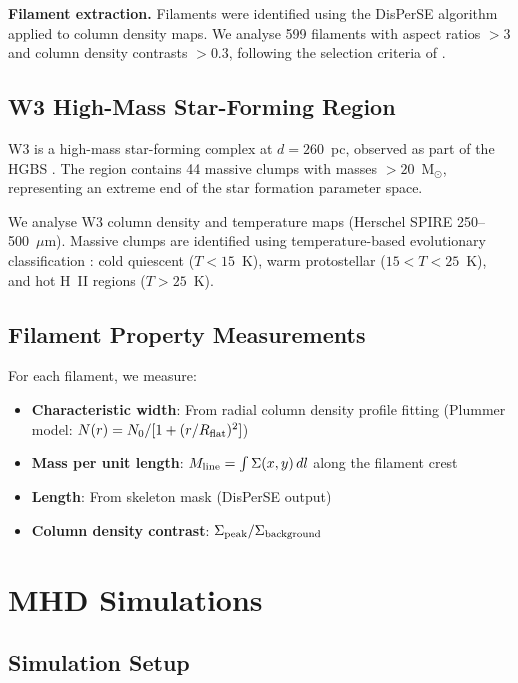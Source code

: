 \documentclass{mnras}
\begin{document}
\textbf{Filament extraction.} Filaments were identified using the DisPerSE algorithm \citep{Sousbie2011} applied to column density maps. We analyse 599 filaments with aspect ratios $>3$ and column density contrasts $>0.3$, following the selection criteria of \citet{Arzoumanian2019}.

\subsection{W3 High-Mass Star-Forming Region}

W3 is a high-mass star-forming complex at $d = 260$~pc, observed as part of the HGBS \citep{Schneider2012}. The region contains 44 massive clumps with masses $>20$~M$_\odot$, representing an extreme end of the star formation parameter space.

We analyse W3 column density and temperature maps (Herschel SPIRE 250--500~$\mu$m). Massive clumps are identified using temperature-based evolutionary classification \citep{Schneider2012}: cold quiescent ($T < 15$~K), warm protostellar ($15 < T < 25$~K), and hot H~II regions ($T > 25$~K).

\subsection{Filament Property Measurements}

For each filament, we measure:
\begin{itemize}
  \item \textbf{Characteristic width}: From radial column density profile fitting (Plummer model: $N(r) = N_0 / [1 + (r/R_{\rm flat})^2]$)
  \item \textbf{Mass per unit length}: $M_{\rm line} = \int \Sigma(x,y) \, dl$ along the filament crest
  \item \textbf{Length}: From skeleton mask (DisPerSE output)
  \item \textbf{Column density contrast}: $\Sigma_{\rm peak} / \Sigma_{\rm background}$
\end{itemize}

\section{MHD Simulations}
\label{sec:simulations}

\subsection{Simulation Setup}
\end{document}
